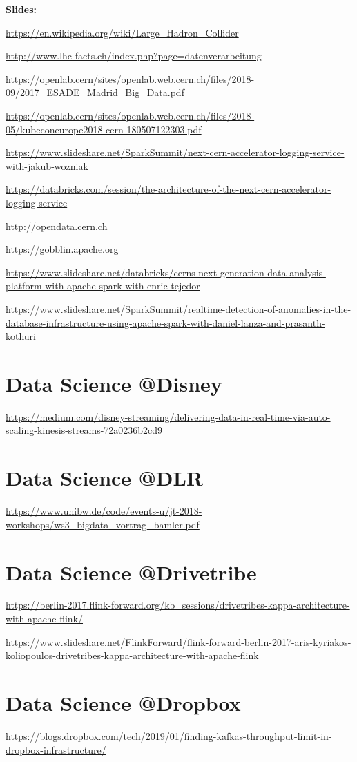 \documentclass[12pt, numbers=noenddot]{scrreprt} %
\begin{document}
\textbf{Slides:}

\url{https://en.wikipedia.org/wiki/Large_Hadron_Collider}

\url{http://www.lhc-facts.ch/index.php?page=datenverarbeitung}

\url{https://openlab.cern/sites/openlab.web.cern.ch/files/2018-09/2017_ESADE_Madrid_Big_Data.pdf}

\url{https://openlab.cern/sites/openlab.web.cern.ch/files/2018-05/kubeconeurope2018-cern-180507122303.pdf}

\url{https://www.slideshare.net/SparkSummit/next-cern-accelerator-logging-service-with-jakub-wozniak}

\url{https://databricks.com/session/the-architecture-of-the-next-cern-accelerator-logging-service}

\url{http://opendata.cern.ch}

\url{https://gobblin.apache.org}

\url{https://www.slideshare.net/databricks/cerns-next-generation-data-analysis-platform-with-apache-spark-with-enric-tejedor}

\url{https://www.slideshare.net/SparkSummit/realtime-detection-of-anomalies-in-the-database-infrastructure-using-apache-spark-with-daniel-lanza-and-prasanth-kothuri}


\section{Data Science @Disney}
\url{https://medium.com/disney-streaming/delivering-data-in-real-time-via-auto-scaling-kinesis-streams-72a0236b2cd9}

\section{Data Science @DLR}
\url{https://www.unibw.de/code/events-u/jt-2018-workshops/ws3_bigdata_vortrag_bamler.pdf}

\section{Data Science @Drivetribe}
\url{https://berlin-2017.flink-forward.org/kb_sessions/drivetribes-kappa-architecture-with-apache-flink/}

\url{https://www.slideshare.net/FlinkForward/flink-forward-berlin-2017-aris-kyriakos-koliopoulos-drivetribes-kappa-architecture-with-apache-flink}

\section{Data Science @Dropbox}
\url{https://blogs.dropbox.com/tech/2019/01/finding-kafkas-throughput-limit-in-dropbox-infrastructure/}
\end{document}
